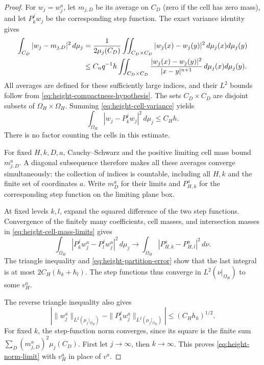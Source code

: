 \begin{proof}
For $w_j=w_j^a$, let $m_{j,D}$ be its average on $C_D$ (zero if the
cell has zero mass), and let $P_k^jw_j$ be the corresponding step function.
The exact variance
identity gives
\begin{align}
 \int_{C_D}|w_j-m_{j,D}|^2\,d\mu_j
 &=\frac{1}{2\mu_j(C_D)}
    \iint_{C_D\times C_D}|w_j(x)-w_j(y)|^2\,d\mu_j(x)d\mu_j(y)
       \notag\\
 &\le C_n q^{-1}h
    \iint_{C_D\times C_D}
       \frac{|w_j(x)-w_j(y)|^2}{|x-y|^{n+1}}
                     \,d\mu_j(x)d\mu_j(y).
 \label{eq:height-cell-variance}
\end{align}
All averages are defined for these sufficiently large indices, and their
$L^2$ bounds follow from \eqref{eq:height-compactness-hypothesis}.
The sets $C_D\times C_D$ are disjoint subsets of
$\Omega_H\times\Omega_H$.  Summing
\eqref{eq:height-cell-variance} yields
\begin{equation}
 \int_{\Omega_H}|w_j-P_k^jw_j|^2\,d\mu_j
                 \le C_H h.
 \label{eq:height-partition-error}
\end{equation}
There is no factor counting the cells in this estimate.

For fixed $H,k,D,a$, Cauchy--Schwarz and the positive limiting cell mass
bound $m_{j,D}^a$.  A diagonal subsequence therefore makes all these
averages converge simultaneously: the collection of indices is
countable, including all $H,k$ and the finite set of coordinates $a$.
Write $m_D^a$ for their limits and $P_{H,k}^a$ for the corresponding step
function on the limiting plane box.

At fixed levels $k,l$, expand the squared difference of the two step
functions.  Convergence of the finitely many coefficients, cell masses,
and intersection masses in \eqref{eq:height-cell-mass-limits} gives
\[
 \int_{\Omega_H}|P_k^jw_j^a-P_l^jw_j^a|^2\,d\mu_j
       \longrightarrow
       \int_{\Omega_H}|P_{H,k}^a-P_{H,l}^a|^2\,d\nu.
\]
The triangle inequality and \eqref{eq:height-partition-error} show that
the last integral is at most $2C_H(h_k+h_l)$.  The step functions thus
converge in $L^2(\nu|_{\Omega_H})$ to some $v_H^a$.

The reverse triangle inequality also gives
\[
 \left|\|w_j^a\|_{L^2(\mu_j|_{\Omega_H})}
       -\|P_k^jw_j^a\|_{L^2(\mu_j|_{\Omega_H})}\right|
       \le (C_H h_k)^{1/2}.
\]
For fixed $k$, the step-function norm converges, since its square is the
finite sum $\sum_D(m_{j,D}^a)^2\mu_j(C_D)$.  First let $j\to\infty$,
then $k\to\infty$.  This proves
\eqref{eq:height-norm-limit} with $v_H^a$ in place of $v^a$.


\end{proof}
